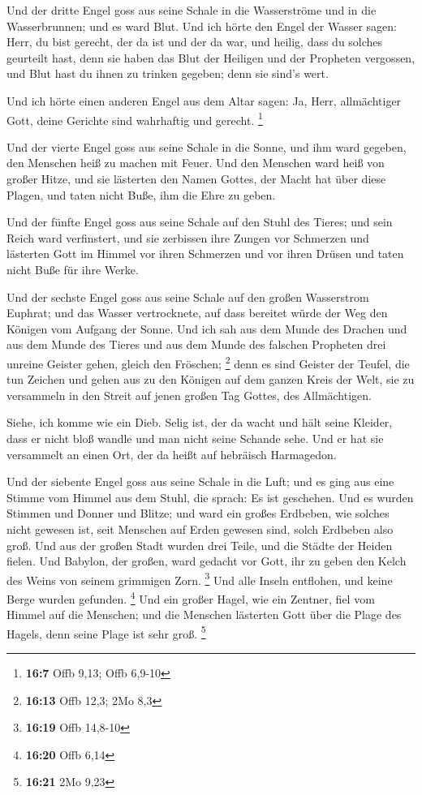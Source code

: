  Und der dritte Engel goss aus seine Schale in die
Wasserströme und in die Wasserbrunnen; und es ward Blut. 
Und ich hörte den Engel der Wasser sagen: Herr, du bist gerecht, der da
ist und der da war, und heilig, dass du solches geurteilt hast,
 denn sie haben das Blut der Heiligen und der Propheten
vergossen, und Blut hast du ihnen zu trinken gegeben; denn sie sind's
wert.

 Und ich hörte einen anderen Engel aus dem Altar sagen:
Ja, Herr, allmächtiger Gott, deine Gerichte sind wahrhaftig und gerecht.
\footnote{\textbf{16:7} Offb 9,13; Offb 6,9-10}

 Und der vierte Engel goss aus seine Schale in die Sonne,
und ihm ward gegeben, den Menschen heiß zu machen mit Feuer.
 Und den Menschen ward heiß von großer Hitze, und sie
lästerten den Namen Gottes, der Macht hat über diese Plagen, und taten
nicht Buße, ihm die Ehre zu geben.

 Und der fünfte Engel goss aus seine Schale auf den Stuhl
des Tieres; und sein Reich ward verfinstert, und sie zerbissen ihre
Zungen vor Schmerzen  und lästerten Gott im Himmel vor
ihren Schmerzen und vor ihren Drüsen und taten nicht Buße für ihre
Werke.

 Und der sechste Engel goss aus seine Schale auf den
großen Wasserstrom Euphrat; und das Wasser vertrocknete, auf dass
bereitet würde der Weg den Königen vom Aufgang der Sonne.
 Und ich sah aus dem Munde des Drachen und aus dem Munde
des Tieres und aus dem Munde des falschen Propheten drei unreine Geister
gehen, gleich den Fröschen; \footnote{\textbf{16:13} Offb 12,3; 2Mo 8,3}
 denn es sind Geister der Teufel, die tun Zeichen und
gehen aus zu den Königen auf dem ganzen Kreis der Welt, sie zu
versammeln in den Streit auf jenen großen Tag Gottes, des Allmächtigen.

 Siehe, ich komme wie ein Dieb. Selig ist, der da wacht
und hält seine Kleider, dass er nicht bloß wandle und man nicht seine
Schande sehe.  Und er hat sie versammelt an einen Ort,
der da heißt auf hebräisch Harmagedon.

 Und der siebente Engel goss aus seine Schale in die
Luft; und es ging aus eine Stimme vom Himmel aus dem Stuhl, die sprach:
Es ist geschehen.  Und es wurden Stimmen und Donner und
Blitze; und ward ein großes Erdbeben, wie solches nicht gewesen ist,
seit Menschen auf Erden gewesen sind, solch Erdbeben also groß.
 Und aus der großen Stadt wurden drei Teile, und die
Städte der Heiden fielen. Und Babylon, der großen, ward gedacht vor
Gott, ihr zu geben den Kelch des Weins von seinem grimmigen Zorn.
\footnote{\textbf{16:19} Offb 14,8-10}  Und alle Inseln
entflohen, und keine Berge wurden gefunden. \footnote{\textbf{16:20}
  Offb 6,14}  Und ein großer Hagel, wie ein Zentner, fiel
vom Himmel auf die Menschen; und die Menschen lästerten Gott über die
Plage des Hagels, denn seine Plage ist sehr groß. \footnote{\textbf{16:21}
  2Mo 9,23}

